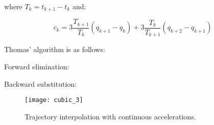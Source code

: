 where $T_k=t_{k+1}-t_k$ and:

\begin{equation*}
c_k=3\frac{T_{k+1}}{T_k}(q_{k+1}-q_k)+3\frac{T_{k}}{T_{k+1}}(q_{k+2}-q_{k+1})
\end{equation*}

Thomas' algorithm is as follows:

\begin{minipage}{0.5\textwidth}
Forward elimination:
\begin{center}
\begin{algorithmic}
    \EndFor
\end{algorithmic}
\end{center}
\end{minipage}
\begin{minipage}{0.5\textwidth}
Backward substitution:
\begin{center}
\begin{algorithmic}
    \EndFor
\end{algorithmic}
\end{center}
\end{minipage}


\begin{figure}[H]
\centering
\texttt{[image: cubic\_3]}
\caption{Trajectory interpolation with continuous accelerations.}
\end{figure}